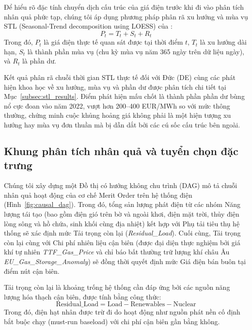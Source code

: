 Để hiểu rõ đặc tính chuyển dịch cấu trúc của giá điện trước khi đi vào phân tích nhân quả phức tạp, chúng tôi áp dụng phương pháp phân rã xu hướng và mùa vụ STL (Seasonal-Trend decomposition using LOESS) của \citet{cleveland1990}:
\begin{equation}
P_t = T_t + S_t + R_t
\end{equation}
Trong đó, $P_t$ là giá điện thực tế quan sát được tại thời điểm $t$, $T_t$ là xu hướng dài hạn, $S_t$ là thành phần mùa vụ (chu kỳ mùa vụ năm 365 ngày trên dữ liệu ngày), và $R_t$ là phần dư. 

Kết quả phân rã chuỗi thời gian STL thực tế đối với Đức (DE) cùng các phát hiện khoa học về xu hướng, mùa vụ và phần dư được phân tích chi tiết tại Mục~\ref{subsec:stl_results}. Điểm phát hiện mấu chốt là thành phần phần dư bùng nổ cực đoan vào năm 2022, vượt hơn 200--400 EUR/MWh so với mức thông thường, chứng minh cuộc khủng hoảng giá không phải là một hiện tượng xu hướng hay mùa vụ đơn thuần mà bị dẫn dắt bởi các cú sốc cấu trúc bên ngoài.

\subsection{Khung phân tích nhân quả và tuyển chọn đặc trưng}

Chúng tôi xây dựng một Đồ thị có hướng không chu trình (DAG) mô tả chuỗi nhân quả hoạt động của cơ chế Merit Order trên hệ thống điện (Hình~\ref{fig:causal_dag}). Trong đó, tổng sản lượng phát điện từ các nhóm Năng lượng tái tạo (bao gồm điện gió trên bờ và ngoài khơi, điện mặt trời, thủy điện lòng sông và hồ chứa, sinh khối cùng địa nhiệt) kết hợp với Phụ tải tiêu thụ hệ thống sẽ xác định mức Tải trọng còn lại (\textit{Residual\_Load}). Cuối cùng, Tải trọng còn lại cùng với Chi phí nhiên liệu cận biên (được đại diện thực nghiệm bởi giá khí tự nhiên \textit{TTF\_Gas\_Price} và chỉ báo bất thường trữ lượng khí châu Âu \textit{EU\_Gas\_Storage\_Anomaly}) sẽ đồng thời quyết định mức Giá điện bán buôn tại điểm nút cận biên.

Tải trọng còn lại là khoảng trống hệ thống cần đáp ứng bởi các nguồn năng lượng hóa thạch cận biên, được tính bằng công thức:
\begin{equation}
\text{Residual\_Load} = \text{Load} - \text{Renewables} - \text{Nuclear}
\end{equation}
Trong đó, điện hạt nhân được trừ đi do hoạt động như nguồn phát nền cố định bắt buộc chạy (must-run baseload) với chi phí cận biên gần bằng không.

